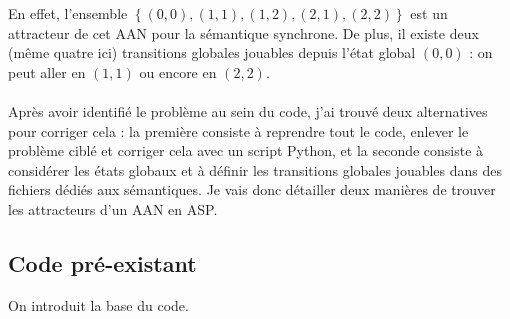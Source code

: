 \documentclass[12pt,a4paper]{article}
\begin{document}
En effet, l'ensemble $\left\{(0,0),(1,1),(1,2),(2,1),(2,2)\right\}$ est un attracteur de cet AAN pour la sémantique synchrone. De plus, il existe deux (même quatre ici) transitions globales jouables depuis l'état global $(0,0)$ : 
on peut aller en $(1,1)$ ou encore en $(2,2)$.\\ \\
Après avoir identifié le problème au sein du code, j'ai trouvé deux alternatives pour corriger cela : la première consiste à reprendre tout le code, enlever le problème ciblé et corriger cela avec un script Python, et la seconde 
consiste à considérer les états globaux et à définir les transitions globales jouables dans des fichiers dédiés aux sémantiques. Je vais donc détailler deux manières de trouver les attracteurs d'un AAN en ASP.

\subsection{Code pré-existant}
On introduit la base du code.\\ \\
\end{document}
